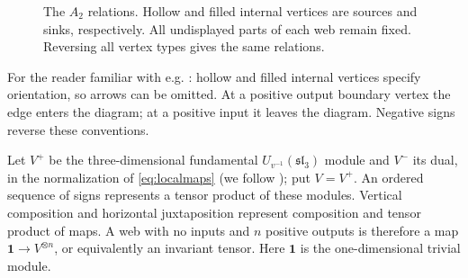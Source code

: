 \documentclass[a4paper,11pt]{amsart}
\newcommand{\one}{\mathbf1}
\newcommand{\tpar}{v}
\newcommand{\vpar}{{\tpar^{-1}}}
\numberwithin{equation}{subsection}
\theoremstyle{plain}
\theoremstyle{definition}
\theoremstyle{remark}
\begin{document}
\begin{figure}[!ht]
\centering
{}
\caption{The $A_2$ relations. Hollow and filled internal vertices are
sources and sinks, respectively. All undisplayed parts of each web
remain fixed. Reversing all vertex types gives the same relations.}
\label{fig:relations}
\end{figure}

\begin{remark}
For the reader familiar with e.g. \cite{Kuperberg}:
hollow and filled internal vertices specify orientation, so arrows
can be omitted. At a positive output boundary vertex the edge enters the diagram;
at a positive input it leaves the diagram. Negative signs reverse
these conventions.
\end{remark}

Let $V^+$ be the three-dimensional fundamental $U_{\vpar}(\mathfrak{sl}_3)$
module and $V^-$ its dual, in the normalization of \autoref{eq:localmaps} (we follow \cite{KK}); put $V=V^+$. 
An ordered sequence of signs represents a tensor product of these
modules. Vertical composition and horizontal juxtaposition represent
composition and tensor product of maps. A web with no inputs and $n$
positive outputs is therefore a map $\one\to V^{\otimes n}$, or
equivalently an invariant tensor. Here $\one$ is the one-dimensional
trivial module.
\end{document}
